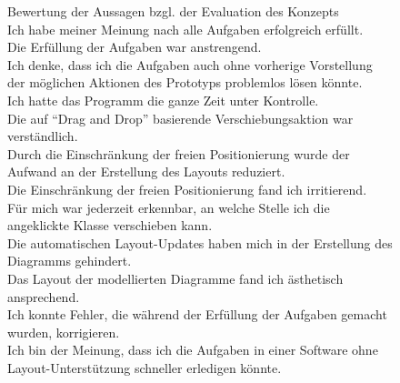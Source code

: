 \begin{figure}[!ht]
\newcommand{\captionvalue}{Bewertung der Aussagen bzgl. der Evaluation des Konzepts}
\caption[\captionvalue]{
\captionvalue
\\\hspace{\textwidth}
 Ich habe meiner Meinung nach alle Aufgaben erfolgreich erfüllt.
\\\hspace{\textwidth}
 Die Erfüllung der Aufgaben war anstrengend.
\\\hspace{\textwidth}
 Ich denke, dass ich die Aufgaben auch ohne vorherige Vorstellung der möglichen Aktionen des Prototyps problemlos lösen könnte.
\\\hspace{\textwidth}
 Ich hatte das Programm die ganze Zeit unter Kontrolle.
\\\hspace{\textwidth}
 Die auf \enquote{Drag and Drop} basierende Verschiebungsaktion war verständlich.
\\\hspace{\textwidth}
 Durch die Einschränkung der freien Positionierung wurde der Aufwand an der Erstellung des Layouts reduziert.
\\\hspace{\textwidth}
 Die Einschränkung der freien Positionierung fand ich irritierend.
\\\hspace{\textwidth}
 Für mich war jederzeit erkennbar, an welche Stelle ich die angeklickte Klasse verschieben kann.
\\\hspace{\textwidth}
 Die automatischen Layout-Updates haben mich in der Erstellung des Diagramms gehindert.
\\\hspace{\textwidth}
 Das Layout der modellierten Diagramme fand ich ästhetisch ansprechend.
\\\hspace{\textwidth}
 Ich konnte Fehler, die während der Erfüllung der Aufgaben gemacht wurden, korrigieren.
\\\hspace{\textwidth}
 Ich bin der Meinung, dass ich die Aufgaben in einer Software ohne Layout-Unterstützung schneller erledigen könnte.
}
\label{fig:evaluation-charts}

\end{figure}

